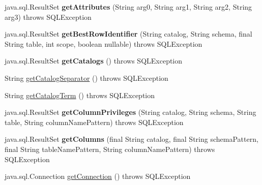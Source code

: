 \begin{DoxyCompactItemize}
java.\+sql.\+Result\+Set {\bfseries get\+Attributes} (String arg0, String arg1, String arg2, String arg3)  throws S\+Q\+L\+Exception 
\item 
\mbox{\label{classcom_1_1mysql_1_1cj_1_1jdbc_1_1_database_meta_data_acc39ad8d7dccb11a125dfe2077a06692}} 
java.\+sql.\+Result\+Set {\bfseries get\+Best\+Row\+Identifier} (String catalog, String schema, final String table, int scope, boolean nullable)  throws S\+Q\+L\+Exception 
\item 
\mbox{\label{classcom_1_1mysql_1_1cj_1_1jdbc_1_1_database_meta_data_a9c17d2d6c3e0b7a464e34c01937f7a0f}} 
java.\+sql.\+Result\+Set {\bfseries get\+Catalogs} ()  throws S\+Q\+L\+Exception 
\item 
String \mbox{\hyperlink{classcom_1_1mysql_1_1cj_1_1jdbc_1_1_database_meta_data_a47550adf181d0dec4658e1936cdf8090}{get\+Catalog\+Separator}} ()  throws S\+Q\+L\+Exception 
\item 
String \mbox{\hyperlink{classcom_1_1mysql_1_1cj_1_1jdbc_1_1_database_meta_data_a86cc7765062731005a70dcfae06fd305}{get\+Catalog\+Term}} ()  throws S\+Q\+L\+Exception 
\item 
\mbox{\label{classcom_1_1mysql_1_1cj_1_1jdbc_1_1_database_meta_data_affd90a096e1d4a31979b1818bd26b557}} 
java.\+sql.\+Result\+Set {\bfseries get\+Column\+Privileges} (String catalog, String schema, String table, String column\+Name\+Pattern)  throws S\+Q\+L\+Exception 
\item 
\mbox{\label{classcom_1_1mysql_1_1cj_1_1jdbc_1_1_database_meta_data_a2f3d1ef210e9e6b2f422bbb5242b56ed}} 
java.\+sql.\+Result\+Set {\bfseries get\+Columns} (final String catalog, final String schema\+Pattern, final String table\+Name\+Pattern, String column\+Name\+Pattern)  throws S\+Q\+L\+Exception 
\item 
java.\+sql.\+Connection \mbox{\hyperlink{classcom_1_1mysql_1_1cj_1_1jdbc_1_1_database_meta_data_aa00cb034e4f6ccbf51eb76593c9cf6e2}{get\+Connection}} ()  throws S\+Q\+L\+Exception 
\item 
\mbox{\label{classcom_1_1mysql_1_1cj_1_1jdbc_1_1_database_meta_data_a5542eb619f90b95f2cc8418c8b61bb67}} 

\end{DoxyCompactItemize}
